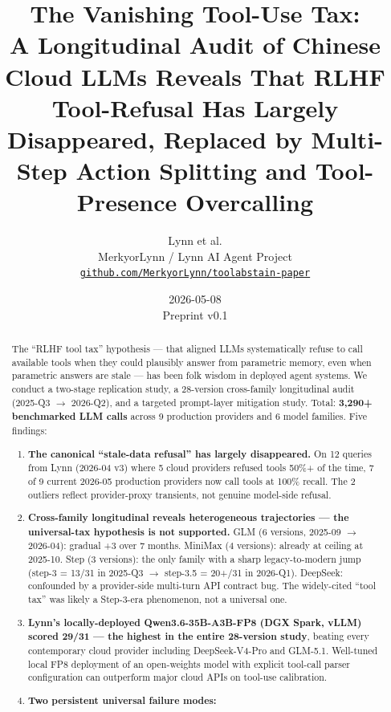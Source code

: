 \documentclass[11pt]{article}
\title{The Vanishing Tool-Use Tax:\\
A Longitudinal Audit of Chinese Cloud LLMs Reveals That RLHF Tool-Refusal Has Largely Disappeared, Replaced by Multi-Step Action Splitting and Tool-Presence Overcalling}
\author{
  Lynn et al.\\
  MerkyorLynn / Lynn AI Agent Project\\
  \texttt{\href{https://github.com/MerkyorLynn/toolabstain-paper}{github.com/MerkyorLynn/toolabstain-paper}}
}
\date{2026-05-08 \\ \small Preprint v0.1}
\begin{document}
\maketitle

\begin{abstract}
The ``RLHF tool tax'' hypothesis --- that aligned LLMs systematically
refuse to call available tools when they could plausibly answer from
parametric memory, even when parametric answers are stale --- has been
folk wisdom in deployed agent systems. We conduct a two-stage
replication study, a 28-version cross-family longitudinal audit (2025-Q3
$\rightarrow$ 2026-Q2), and a targeted prompt-layer mitigation study. Total:
\textbf{3,290+ benchmarked LLM calls} across 9 production providers and
6 model families. Five findings:

\begin{enumerate}
\def\labelenumi{\arabic{enumi}.}
\item
  \textbf{The canonical ``stale-data refusal'' has largely disappeared.}
  On 12 queries from Lynn (2026-04 v3) where 5 cloud providers refused
  tools 50\%+ of the time, 7 of 9 current 2026-05 production providers
  now call tools at 100\% recall. The 2 outliers reflect provider-proxy
  transients, not genuine model-side refusal.
\item
  \textbf{Cross-family longitudinal reveals heterogeneous trajectories
  --- the universal-tax hypothesis is not supported.} GLM (6 versions,
  2025-09 $\rightarrow$ 2026-04): gradual +3 over 7 months. MiniMax (4 versions):
  already at ceiling at 2025-10. Step (3 versions): the only family with
  a sharp legacy-to-modern jump (step-3 = 13/31 in 2025-Q3 $\rightarrow$ step-3.5 =
  20+/31 in 2026-Q1). DeepSeek: confounded by a provider-side multi-turn
  API contract bug. The widely-cited ``tool tax'' was likely a
  Step-3-era phenomenon, not a universal one.
\item
  \textbf{Lynn's locally-deployed Qwen3.6-35B-A3B-FP8 (DGX Spark, vLLM)
  scored 29/31 --- the highest in the entire 28-version study}, beating
  every contemporary cloud provider including DeepSeek-V4-Pro and
  GLM-5.1. Well-tuned local FP8 deployment of an open-weights model with
  explicit tool-call parser configuration can outperform major cloud
  APIs on tool-use calibration.
\item
  \textbf{Two persistent universal failure modes:}


\end{enumerate}
\end{abstract}
\end{document}
